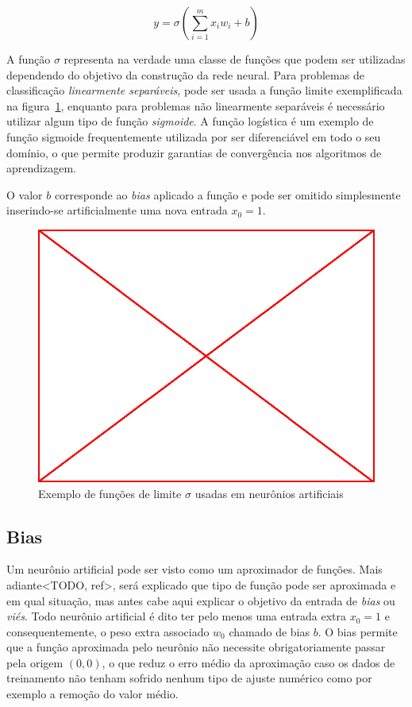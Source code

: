 $$y=\sigma(\sum_{i=1}^{m}x_i w_i + b)$$

A função $\sigma$ representa na verdade uma classe de funções que podem ser
utilizadas dependendo do objetivo da construção da rede neural. Para problemas
de classificação \emph{linearmente separáveis}, pode ser usada a função limite
exemplificada na figura~\ref{fig:lim-fun}, enquanto para problemas não
linearmente separáveis é necessário utilizar algum tipo de função
\emph{sigmoide}. A função logística é um exemplo de função sigmoide
frequentemente utilizada por ser diferenciável em todo o seu domínio, o que
permite produzir garantias de convergência nos algoritmos de aprendizagem.

O valor $b$ corresponde ao \emph{bias} aplicado a função e pode ser omitido
simplesmente inserindo-se artificialmente uma nova entrada $x_0 = 1$.

\begin{figure}\label{fig:lim-fun}
  \caption{Exemplo de funções de limite $\sigma$ usadas em neurônios artificiais}
  \begin{center}
    \includegraphics[scale=0.5]{placeholder}
  \end{center}
\end{figure}

\subsection{Bias}

Um neurônio artificial pode ser visto como um aproximador de funções. Mais
adiante<TODO, ref>, será explicado que tipo de função pode ser aproximada e em
qual situação, mas antes cabe aqui explicar o objetivo da entrada de
\emph{bias} ou \emph{viés}. Todo neurônio artificial é dito ter pelo menos uma
entrada extra $x_0 = 1$ e consequentemente, o peso extra associado $w_0$
chamado de bias $b$. O bias permite que a função aproximada pelo neurônio não
necessite obrigatoriamente passar pela origem $(0,0)$, o que reduz o erro médio
da aproximação caso os dados de treinamento não tenham sofrido nenhum tipo de
ajuste numérico como por exemplo a remoção do valor médio.

